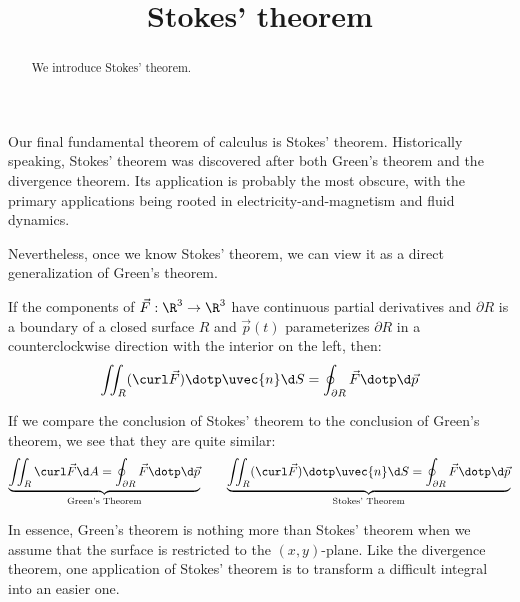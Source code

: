 \documentclass{ximera}
\title[Dig-In:]{Stokes' theorem}
\begin{document}
\begin{abstract}
  We introduce Stokes' theorem.
\end{abstract}
\maketitle

Our final fundamental theorem of calculus is Stokes'
theorem. Historically speaking, Stokes' theorem was discovered after
both Green's theorem and the divergence theorem. Its application is
probably the most obscure, with the primary applications being rooted
in electricity-and-magnetism and fluid dynamics.

Nevertheless, once we know Stokes' theorem, we can view it as a direct
generalization of Green's theorem.

\begin{theorem}
  If the components of $\vec{F}:\R^3\to\R^3$ have continuous partial
  derivatives and $\partial R$ is a boundary of a closed surface $R$
  and $\vec{p}(t)$ parameterizes $\partial R$ in a counterclockwise
  direction with the interior on the left, then:
  \[
  \iint_R (\curl \vec{F})\dotp \uvec{n}\d S = \oint_{\partial R}
  \vec{F}\dotp\d\vec{p}
  \]
\end{theorem}

If we compare the conclusion of Stokes' theorem to the conclusion of
Green's theorem, we see that they are quite similar:
  \[
  \underbrace{\iint_R \curl\vec{F}\d A = \oint_{\partial R} \vec{F}\dotp\d\vec{p}}_{\text{Green's Theorem}}\qquad \underbrace{\iint_R (\curl \vec{F})\dotp \uvec{n}\d S = \oint_{\partial R}
  \vec{F}\dotp\d\vec{p}}_{\text{Stokes' Theorem}}
  \]

In essence, Green's theorem is nothing more than Stokes' theorem when
we assume that the surface is restricted to the $(x,y)$-plane. Like
the divergence theorem, one application of Stokes' theorem is to
transform a difficult integral into an easier one.
\end{document}
